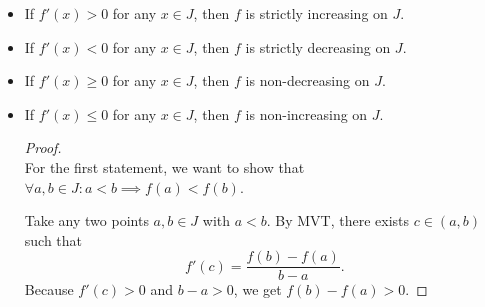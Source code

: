 \documentclass[a4paper,12pt]{report}
\begin{document}
\begin{itemize}
\begin{itemize}
\begin{proof}
By Fermat's Theorem,
\[f'(c)=0.\]
\end{proof}
Let function $f\colon I\subseteq\mathbb{R}\to\mathbb{R}$ be continuous on an interval $[a, b]\subseteq I$ and differentiable on $(a,b)$, then
\[\exists c\in (a, b)\text{\ s.t.\ }f'(c)=\frac{f(b)-f(a)}{b-a}.\]
\begin{proof}
Let
\[\phi(x) = f(x) - \frac{f(b)-f(a)}{b-a} (x-a).\]
\[\phi(a)=\phi(b)=f(a).\]
By Rolle's Theorem, there exists $c\in (a,b)$ such that $\phi'(c)=0$.
\[\phi'(c)=f'(c)-\frac{f(b)-f(a)}{b-a}.\]
\end{proof}
Let functions $f\colon I\subseteq\mathbb{R}\to\mathbb{R}$ and $g\colon J\subseteq\mathbb{R}\to\mathbb{R}$ be continuous on an interval $[a, b]\subseteq I\cap J$ and differentiable on $(a,b)$, and $g'(x)\neq 0$ for all $x\in (a,b)$, then
\[\exists c\in (a,b)\text{\ s.t.\ }\frac{f(b)-f(a)}{g(b)-g(a)}=\frac{f'(c)}{g'(c)}.\]
\begin{proof}\mbox{}\\
    Define a function
    \[\phi(x)=f(x)-\frac{f(b)-f(a)}{g(b)-g(a)}g(x).\]
    \[\phi(b)-\phi(a)=\qty(f(b)-f(a))-\frac{f(b)-f(a)}{g(b)-g(a)}\qty(g(b)-g(a))=0.\]
    By Rolle's Theorem, there exists $c\in (a,b)$ such that $\phi'(c)=0$.
    \[\phi'(x)=f'(x)-\frac{f(b)-f(a)}{g(b)-g(a)}g'(x).\]
    \[\frac{f(b)-f(a)}{g(b)-g(a)}=\frac{f'(c)}{g'(c)}.\]
\end{proof}
Let functions $f\colon I\subseteq\mathbb{R}\to\mathbb{R}$ be differentiable on an interval $J\subseteq I$.
\bit
\item If $f'(x)>0$ for any $x\in J$, then $f$ is strictly increasing on $J$.
\item If $f'(x)<0$ for any $x\in J$, then $f$ is strictly decreasing on $J$.
\item If $f'(x)\geq 0$ for any $x\in J$, then $f$ is non-decreasing on $J$.
\item If $f'(x)\leq 0$ for any $x\in J$, then $f$ is non-increasing on $J$.
\eit
\begin{proof}\mbox{}\\
    For the first statement, we want to show that $\forall a,b\in J\colon a<b\implies f(a)<f(b)$.

    Take any two points $a,b\in J$ with $a<b$. By MVT, there exists $c\in (a,b)$ such that
    \[f'(c)=\frac{f(b)-f(a)}{b-a}.\]
    Because $f'(c)>0$ and $b-a>0$, we get $f(b)-f(a)>0$.


\end{proof}
\end{itemize}
\end{itemize}
\end{document}
